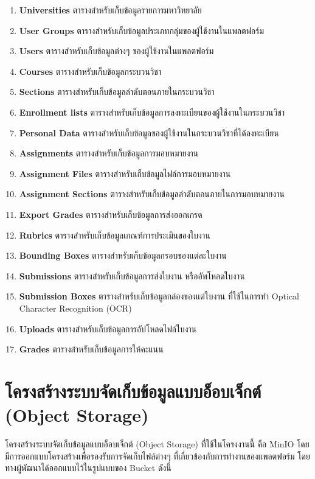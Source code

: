   \begin{enumerate}
    \item \textbf{Universities} ตารางสำหรับเก็บข้อมูลรายการมหาวิทยาลัย
    \item \textbf{User Groups} ตารางสำหรับเก็บข้อมูลประเภทกลุ่มของผู้ใช้งานในแพลตฟอร์ม
    \item \textbf{Users} ตารางสำหรับเก็บข้อมูลต่างๆ ของผู้ใช้งานในแพลตฟอร์ม
    \item \textbf{Courses} ตารางสำหรับเก็บข้อมูลกระบวนวิชา
    \item \textbf{Sections} ตารางสำหรับเก็บข้อมูลลำดับตอนภายในกระบวนวิชา
    \item \textbf{Enrollment lists} ตารางสำหรับเก็บข้อมูลการลงทะเบียนของผู้ใช้งานในกระบวนวิชา
    \item \textbf{Personal Data} ตารางสำหรับเก็บข้อมูลของผู้ใช้งานในกระบวนวิชาที่ได้ลงทะเบียน
    \item \textbf{Assignments} ตารางสำหรับเก็บข้อมูลการมอบหมายงาน
    \item \textbf{Assignment Files} ตารางสำหรับเก็บข้อมูลไฟล์การมอบหมายงาน
    \item \textbf{Assignment Sections} ตารางสำหรับเก็บข้อมูลลำดับตอนภายในการมอบหมายงาน
    \item \textbf{Export Grades} ตารางสำหรับเก็บข้อมูลการส่งออกเกรด
    \item \textbf{Rubrics} ตารางสำหรับเก็บข้อมูลเกณฑ์การประเมินของใบงาน
    \item \textbf{Bounding Boxes} ตารางสำหรับเก็บข้อมูลกรอบของแต่ละใบงาน
    \item \textbf{Submissions} ตารางสำหรับเก็บข้อมูลการส่งใบงาน หรืออัพโหลดใบงาน
    \item \textbf{Submission Boxes} ตารางสำหรับเก็บข้อมูลกล่องของแต่ใบงาน ที่ใช้ในการทำ Optical Character Recognition (OCR)
    \item \textbf{Uploads} ตารางสำหรับเก็บข้อมูลการอัปโหลดไฟล์ใบงาน
    \item \textbf{Grades} ตารางสำหรับเก็บข้อมูลการให้คะแนน
  \end{enumerate}

\section{โครงสร้างระบบจัดเก็บข้อมูลแบบอ็อบเจ็กต์ (Object Storage)}
  \qquad โครงสร้างระบบจัดเก็บข้อมูลแบบอ็อบเจ็กต์ (Object Storage) ที่ใช้ในโครงงานนี้ คือ MinIO โดยมีการออกแบบโครงสร้างเพื่อรองรับการจัดเก็บไฟล์ต่างๆ
  ที่เกี่ยวข้องกับการทำงานของแพลตฟอร์ม โดยทางผู้พัฒนาได้ออกแบบไว้ในรูปแบบของ Bucket ดังนี้
